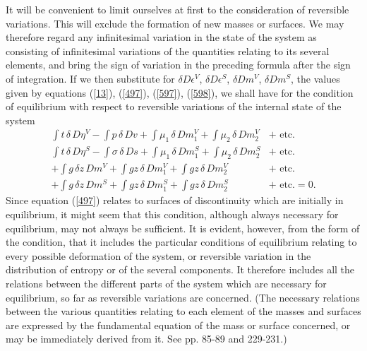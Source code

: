 \documentclass[12pt]{article}
\newcommand{\dd}{\delta}
\begin{document}
It will be convenient to limit ourselves at first to the consideration of reversible variations. This will exclude the formation of new masses or surfaces. We may therefore regard any infinitesimal variation in the state of the system as consisting of infinitesimal variations of the quantities relating to its several elements, and bring the sign of variation in the preceding formula after the sign of integration. If we then substitute for $\dd D\epsilon^V$, $\dd D\epsilon^S$, $\dd Dm^V$, $\dd Dm^S$, the values given by equations (\ref{13}), (\ref{497}), (\ref{597}), (\ref{598}), we shall have for the condition of equilibrium with respect to reversible variations of the internal state of the system
\begin{equation} \begin{aligned} \int t \, \dd \, D\eta^V - \int p \, \dd \, Dv+\int \mu_1 \,\dd\,Dm_1^V +\int \mu_2 \,\dd\,Dm_2^V &+\text{ etc.} \\
\int t \, \dd \, D\eta^S - \int \sigma \, \dd \, Ds+\int \mu_1 \,\dd\,Dm_1^S +\int \mu_2 \,\dd\,Dm_2^S &+ \text{ etc.} \\
+\int g \, \dd z \, Dm^V + \int gz \, \dd \, Dm_1^V +\int gz \, \dd \, Dm_2^V &+\text{ etc.}\\ 
+\int g \, \dd z \, Dm^S + \int gz \, \dd \, Dm_1^S +\int gz \, \dd \, Dm_2^S &+ \text{ etc.} =0.  \label{600} \end{aligned} \end{equation}
Since equation (\ref{497}) relates to surfaces of discontinuity which are initially in equilibrium, it might seem that this condition, although always necessary for equilibrium, may not always be sufficient. It is evident, however, from the form of the condition, that it includes the particular conditions of equilibrium relating to every possible deformation of the system, or reversible variation in the distribution of entropy or of the several components. It therefore includes all the relations between the different parts of the system which are necessary for equilibrium, so far as reversible variations are concerned. (The necessary relations between the various quantities relating to each element of the masses and surfaces are expressed by the fundamental equation of the mass or surface concerned, or may be immediately derived from it. See pp. 85-89 and 229-231.)
\end{document}
